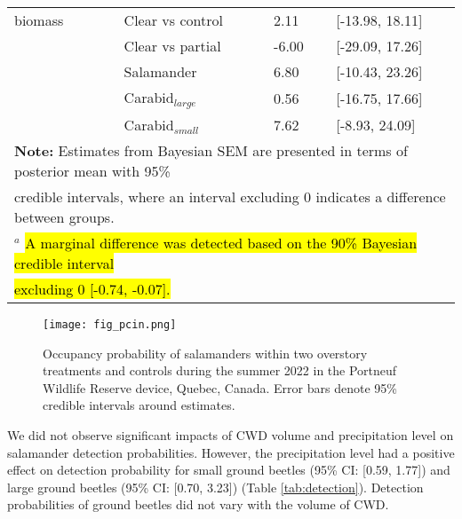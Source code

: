 \begin{table}[h!]
\begin{tabular}{lllll}
      biomass             && Clear vs control  & \hspace{1mm}2.11 & [-13.98, 18.11] \\ 
                          && Clear vs partial  & -6.00 & [-29.09, 17.26] \\  
                          && Salamander        & \hspace{1mm}6.80 & [-10.43, 23.26] \\ 
                          && Carabid$_{large}$      & \hspace{1mm}0.56 & [-16.75, 17.66] \\ 
                          && Carabid$_{small}$      & \hspace{1mm}7.62 & [-8.93, 24.09] \\ 
      \hline
      \multicolumn{5}{l}{\textbf{Note:} Estimates from Bayesian SEM are presented in terms of posterior mean with 95\%} \\
      \multicolumn{5}{l}{credible intervals, where an interval excluding 0 indicates a difference between groups.} \\
      \multicolumn{5}{l}{$^{a}$ \hl{A marginal difference was detected based on the 90\% Bayesian credible interval} } \\
      \multicolumn{5}{l}{\hl{excluding 0 [-0.74, -0.07].}}
  \end{tabular}
\end{table}

\pagebreak

\begin{figure}[h!]
  \centering
  \texttt{[image: fig\_pcin.png]}
  \caption[Occupancy probability of salamanders under overstory treatments]
  {Occupancy probability of salamanders within two overstory treatments and controls during the summer 2022 in the Portneuf Wildlife Reserve device, Quebec, Canada. 
  Error bars denote 95\% credible intervals around estimates.}
  \label{fig:pcin}
\end{figure}

\vspace{10pt}

\clearpage

We did not observe significant impacts of CWD volume and precipitation level on salamander detection probabilities. 
However, the precipitation level had a positive effect on detection probability for small ground beetles (95\% CI: [0.59, 1.77]) and large ground beetles (95\% CI: [0.70, 3.23]) (Table \ref{tab:detection}). 
Detection probabilities of ground beetles did not vary with the volume of CWD.

